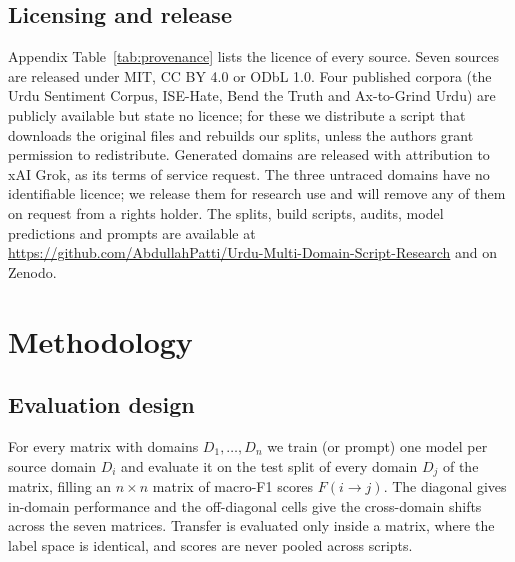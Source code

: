 \documentclass[acmsmall,screen]{acmart}
\newcommand{\repo}{\url{https://github.com/AbdullahPatti/Urdu-Multi-Domain-Script-Research}}
\begin{document}
\subsection{Licensing and release}\label{sec:licensing}
Appendix Table~\ref{tab:provenance} lists the licence of every source. Seven sources are released under MIT, CC BY 4.0 or ODbL 1.0. Four published corpora (the Urdu Sentiment Corpus, ISE-Hate, Bend the Truth and Ax-to-Grind Urdu) are publicly available but state no licence; for these we distribute a script that downloads the original files and rebuilds our splits, unless the authors grant permission to redistribute. Generated domains are released with attribution to xAI Grok, as its terms of service request. The three untraced domains have no identifiable licence; we release them for research use and will remove any of them on request from a rights holder. The splits, build scripts, audits, model predictions and prompts are available at \repo{} and on Zenodo.

\section{Methodology}\label{sec:method}

\subsection{Evaluation design}
For every matrix with domains $D_1,\dots,D_n$ we train (or prompt) one model per source domain $D_i$ and evaluate it on the test split of every domain $D_j$ of the matrix, filling an $n\times n$ matrix of macro-F1 scores $F(i\to j)$. The diagonal gives in-domain performance and the off-diagonal cells give the \NumShifts{} cross-domain shifts across the seven matrices. Transfer is evaluated only inside a matrix, where the label space is identical, and scores are never pooled across scripts.
\end{document}
